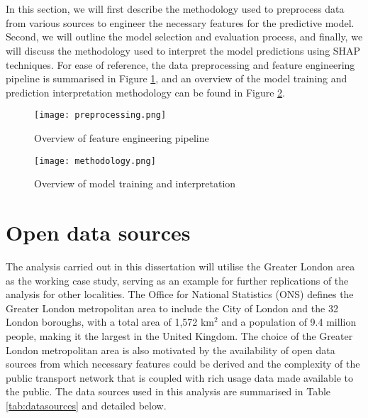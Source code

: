 \pagebreak 
\section*{}

In this section, we will first describe the methodology used to preprocess data from various sources to engineer the necessary features for the predictive model. Second, we will outline the model selection and evaluation process, and finally, we will discuss the methodology used to interpret the model predictions using SHAP techniques. For ease of reference, the data preprocessing and feature engineering pipeline is summarised in Figure \ref{fig:preprocessing}, and an overview of the model training and prediction interpretation methodology can be found in Figure \ref{fig:methodology}.

\begin{figure}[h]
    \centering
    \texttt{[image: preprocessing.png]}
    \caption{Overview of feature engineering pipeline}
    \label{fig:preprocessing}
\end{figure}

\begin{figure}[!ht]
    \centering
    \texttt{[image: methodology.png]}
    \caption{Overview of model training and interpretation}
    \label{fig:methodology}
\end{figure}

\pagebreak %
\section{Open data sources}

The analysis carried out in this dissertation will utilise the Greater London area as the working case study, serving as an example for further replications of the analysis for other localities. The Office for National Statistics (ONS) defines the Greater London metropolitan area to include the City of London and the 32 London boroughs, with a total area of 1,572 km$^2$ and a population of 9.4 million people, making it the largest in the United Kingdom. The choice of the Greater London metropolitan area is also motivated by the availability of open data sources from which necessary features could be derived and the complexity of the public transport network that is coupled with rich usage data made available to the public. The data sources used in this analysis are summarised in Table \ref{tab:datasources} and detailed below.


